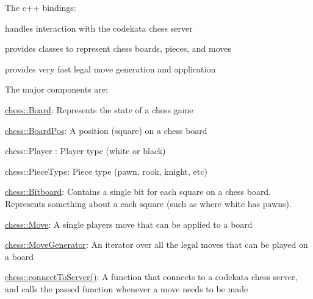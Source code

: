 \label{index_md_cpp_binding_README}%
%
The c++ bindings\+:
\begin{DoxyItemize}
\item handles interaction with the codekata chess server
\item provides classes to represent chess boards, pieces, and moves
\item provides very fast legal move generation and application
\end{DoxyItemize}

The major components are\+:
\begin{DoxyItemize}
\item {\ttfamily \mbox{\hyperlink{classchess_1_1Board}{chess\+::\+Board}}}\+: Represents the state of a chess game
\item {\ttfamily \mbox{\hyperlink{classchess_1_1BoardPos}{chess\+::\+Board\+Pos}}}\+: A position (square) on a chess board
\item {\ttfamily chess\+::\+Player} \+: Player type (white or black)
\item {\ttfamily chess\+::\+Piece\+Type}\+: Piece type (pawn, rook, knight, etc)
\item {\ttfamily \mbox{\hyperlink{classchess_1_1Bitboard}{chess\+::\+Bitboard}}}\+: Contains a single bit for each square on a chess board. Represents something about a each square (such as where white has pawns).
\item {\ttfamily \mbox{\hyperlink{classchess_1_1Move}{chess\+::\+Move}}}\+: A single player\textquotesingle{}s move that can be applied to a board
\item {\ttfamily \mbox{\hyperlink{classchess_1_1MoveGenerator}{chess\+::\+Move\+Generator}}}\+: An iterator over all the legal moves that can be played on a board
\item {\ttfamily \mbox{\hyperlink{chess_8hpp_a3220f6624c3f51e4a824034c46c9680c}{chess\+::connect\+To\+Server()}}}\+: A function that connects to a codekata chess server, and calls the passed function whenever a move needs to be made 
\end{DoxyItemize}